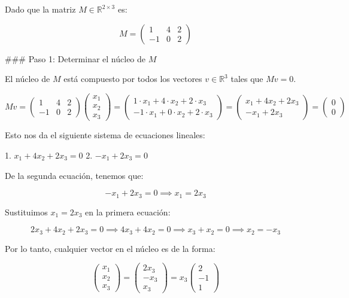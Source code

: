 \documentclass{article}
\begin{document}
Dado que la matriz \( M \in \mathbb{R}^{2 \times 3} \) es:

\[ M = \begin{pmatrix}
1 & 4 & 2 \\
-1 & 0 & 2
\end{pmatrix} \]

### Paso 1: Determinar el núcleo de \(M\)

El núcleo de \(M\) está compuesto por todos los vectores \( v \in \mathbb{R}^3 \) tales que \( Mv = 0 \).

\[ Mv = \begin{pmatrix}
1 & 4 & 2 \\
-1 & 0 & 2
\end{pmatrix} \begin{pmatrix}
x_1 \\
x_2 \\
x_3
\end{pmatrix} = \begin{pmatrix}
1 \cdot x_1 + 4 \cdot x_2 + 2 \cdot x_3 \\
-1 \cdot x_1 + 0 \cdot x_2 + 2 \cdot x_3
\end{pmatrix} = \begin{pmatrix}
x_1 + 4 x_2 + 2 x_3 \\
-x_1 + 2 x_3
\end{pmatrix} = \begin{pmatrix}
0 \\
0
\end{pmatrix} \]

Esto nos da el siguiente sistema de ecuaciones lineales:

1. \( x_1 + 4 x_2 + 2 x_3 = 0 \)
2. \( -x_1 + 2 x_3 = 0 \)

De la segunda ecuación, tenemos que:

\[ -x_1 + 2 x_3 = 0 \implies x_1 = 2 x_3 \]

Sustituimos \( x_1 = 2 x_3 \) en la primera ecuación:

\[ 2 x_3 + 4 x_2 + 2 x_3 = 0 \implies 4 x_3 + 4 x_2 = 0 \implies x_3 + x_2 = 0 \implies x_2 = -x_3 \]

Por lo tanto, cualquier vector en el núcleo es de la forma:

\[ \begin{pmatrix}
x_1 \\
x_2 \\
x_3
\end{pmatrix} = \begin{pmatrix}
2 x_3 \\
-x_3 \\
x_3
\end{pmatrix} = x_3 \begin{pmatrix}
2 \\
-1 \\
1
\end{pmatrix} \]
\end{document}
